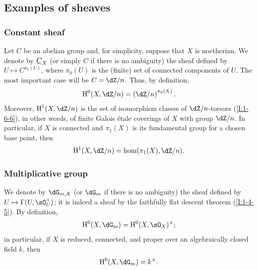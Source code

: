 \subsection{Examples of sheaves}\label{I:2-2}

\subsubsection{Constant sheaf}\label{I:2-2-1}

Let $C$ be an abelian group and, for simplicity, suppose that $X$ is
noetherian. We denote by $\underline{C}_X$ (or simply $C$ if there is no
ambiguity) the sheaf defined by $U\mapsto C^{\pi_0(U)}$, where
$\pi_0(U)$ is the (finite) set of connected components of $U$. The most
important case will be $C=\dZ/n$. Thus, by definition,
\[
  \h^0(X,\dZ/n)=\left(\dZ/n\right)^{\pi_0(X)}\text{.}
\]
Moreover, $\h^1(X,\dZ/n)$ is the set of isomorphism classes of
$\dZ/n$-torsors (\ref{I:1-6-6}), in other words, of finite Galois étale
coverings of $X$ with group $\dZ/n$. In particular, if $X$ is connected
and $\pi_1(X)$ is its fundamental group for a chosen base point, then
\[
  \h^1(X,\dZ/n) = \hom(\pi_1(X),\dZ/n)\text{.}
\]

\subsubsection{Multiplicative group}\label{I:2-2-2}

We denote by $\dG_{m,X}$ (or $\dG_m$ if there is no ambiguity) the sheaf
defined by $U\mapsto\Gamma(U,\sO_U^\times)$; it is indeed a sheaf by the
faithfully flat descent theorem (\ref{I:1-4-5}). By definition,
\[
  \h^0(X,\dG_m) = \h^0(X,\sO_X)^\times\text{;}
\]
in particular, if $X$ is reduced, connected, and proper over an
algebraically closed field $k$, then
\[
  \h^0(X,\dG_m) = k^\times\text{.}
\]

